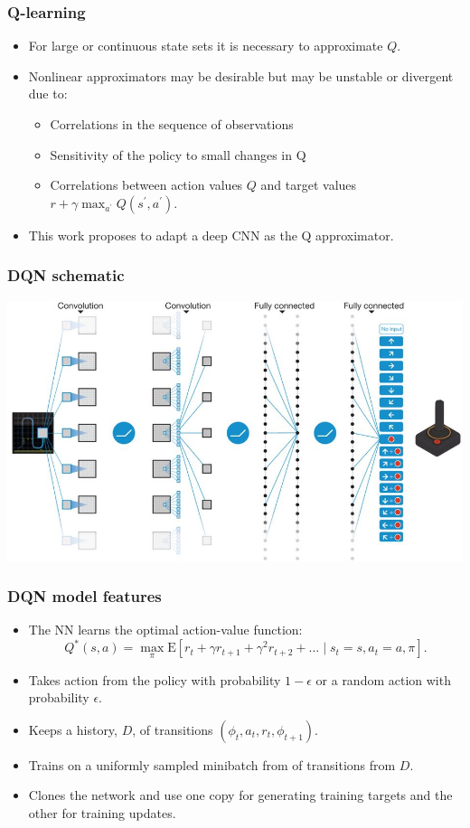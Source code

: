 \documentclass{beamer}
\begin{document}
\begin{frame}
  \frametitle{Q-learning}
  \begin{itemize}
  \item For large or continuous state sets it is necessary to approximate \(Q\).
  \item Nonlinear approximators may be desirable but may be unstable or
    divergent due to:
    \begin{itemize}
    \item Correlations in the sequence of observations
    \item Sensitivity of the policy to small changes in Q
    \item Correlations between action values \(Q\) and target values \(r+\gamma\max_{a^\prime}Q(s^\prime,a^\prime)\).
    \end{itemize}
  \item This work proposes to adapt a deep CNN as the Q approximator.
  \end{itemize}
\end{frame}

\begin{frame}
  \frametitle{DQN schematic}
  \includegraphics[width=\textwidth]{nature14236-f1.jpg}
\end{frame}

\begin{frame}
  \frametitle{DQN model features}
  \begin{itemize}
  \item The NN learns the optimal action-value function:
    \begin{equation*}
      Q^*(s,a) = \max_\pi\text{E}
      \left[
        r_t + \gamma r_{t+1} + \gamma^2 r_{t+2}+\dots\mid s_t=s, a_t=a, \pi
      \right].
    \end{equation*}
  \item Takes action from the policy with probability \(1-\epsilon\) or a random action with probability \(\epsilon\).
  \item Keeps a history, \(D\), of transitions \((\phi_t, a_t, r_t, \phi_{t+1})\).
  \item Trains on a uniformly sampled minibatch from of transitions from \(D\).
  \item Clones the network and use one copy for generating training targets and
    the other for training updates.
  \end{itemize}
\end{frame}
\end{document}
